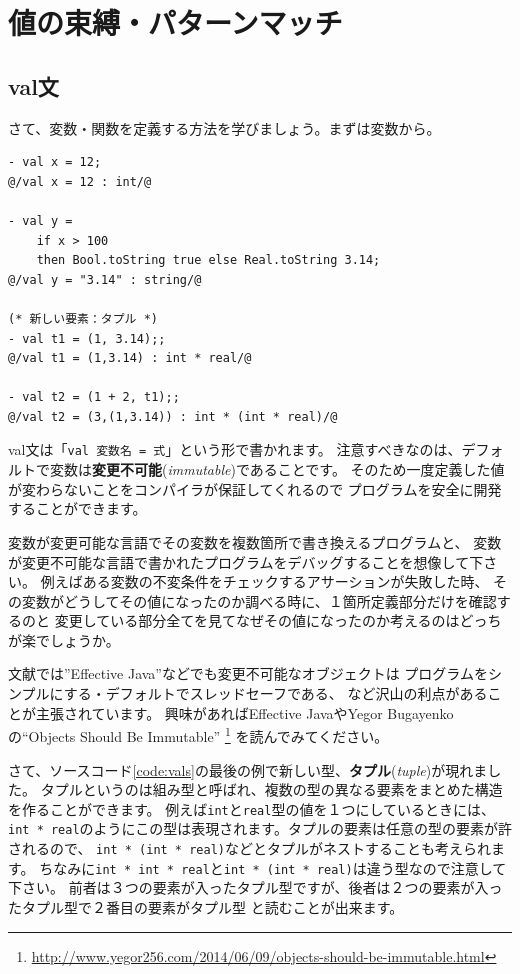 \documentclass[11pt,a4paper]{article}
\begin{document}
\section{値の束縛・パターンマッチ}
\subsection{val文}
さて、変数・関数を定義する方法を学びましょう。まずは変数から。
\begin{lstlisting}[caption={val文}, label={code:first-definition}]
- val x = 12;
@/val x = 12 : int/@

- val y =
    if x > 100
    then Bool.toString true else Real.toString 3.14;
@/val y = "3.14" : string/@

(* 新しい要素：タプル *)
- val t1 = (1, 3.14);;
@/val t1 = (1,3.14) : int * real/@

- val t2 = (1 + 2, t1);;
@/val t2 = (3,(1,3.14)) : int * (int * real)/@
\end{lstlisting}

val文は「\lstinline{val 変数名 = 式}」という形で書かれます。
注意すべきなのは、デフォルトで変数は{\bfseries 変更不可能}({\itshape immutable})であることです。
そのため一度定義した値が変わらないことをコンパイラが保証してくれるので
プログラムを安全に開発することができます。

変数が変更可能な言語でその変数を複数箇所で書き換えるプログラムと、
変数が変更不可能な言語で書かれたプログラムをデバッグすることを想像して下さい。
例えばある変数の不変条件をチェックするアサーションが失敗した時、
その変数がどうしてその値になったのか調べる時に、１箇所定義部分だけを確認するのと
変更している部分全てを見てなぜその値になったのか考えるのはどっちが楽でしょうか。

文献では''Effective Java''などでも変更不可能なオブジェクトは
プログラムをシンプルにする・デフォルトでスレッドセーフである、
など沢山の利点があることが主張されています。
興味があればEffective JavaやYegor Bugayenkoの``Objects Should Be Immutable''
\footnote{\url{http://www.yegor256.com/2014/06/09/objects-should-be-immutable.html}}
を読んでみてください。

さて、ソースコード\ref{code:vals}の最後の例で新しい型、{\bfseries タプル}({\itshape tuple})が現れました。
タプルというのは組み型と呼ばれ、複数の型の異なる要素をまとめた構造を作ることができます。
例えば\lstinline{int}と\lstinline{real}型の値を１つにしているときには、
\lstinline{int * real}のようにこの型は表現されます。タプルの要素は任意の型の要素が許されるので、
\lstinline{int * (int * real)}などとタプルがネストすることも考えられます。
ちなみに\lstinline{int * int * real}と\lstinline{int * (int * real)}は違う型なので注意して下さい。
前者は３つの要素が入ったタプル型ですが、後者は２つの要素が入ったタプル型で２番目の要素がタプル型
と読むことが出来ます。
\end{document}

